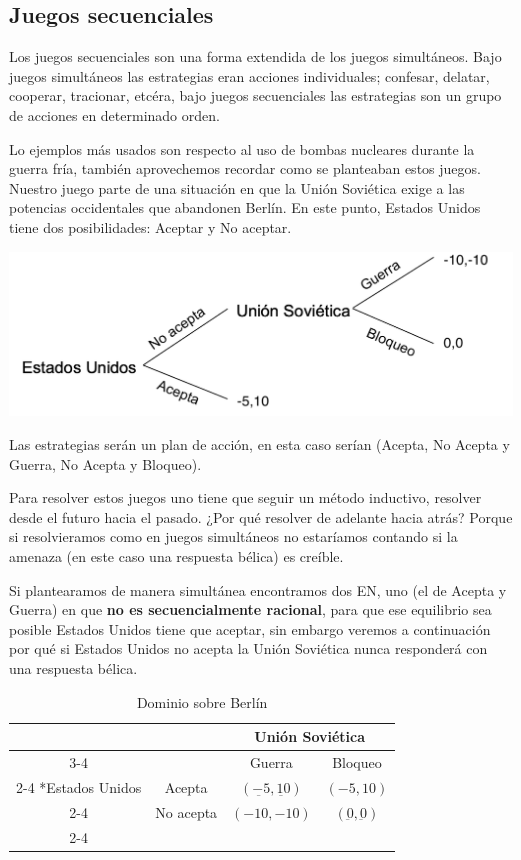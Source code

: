\subsection{Juegos secuenciales}

Los juegos secuenciales son una forma extendida de los juegos simultáneos. Bajo juegos simultáneos las estrategias eran acciones individuales; confesar, delatar, cooperar, tracionar, etcéra, bajo juegos secuenciales las estrategias son un grupo de acciones en determinado orden. 

Lo ejemplos más usados son respecto al uso de bombas nucleares durante la guerra fría, también aprovechemos recordar como se planteaban estos juegos. Nuestro juego parte de una situación en que la Unión Soviética exige a las potencias
occidentales que abandonen Berlín. En este punto, Estados Unidos tiene dos posibilidades:
Aceptar y No aceptar.

\begin{center}
    \includegraphics[scale=0.5]{Figuras/juegos secuencia.png}  
\end{center}
Las estrategias serán un plan de acción, en esta caso serían (Acepta, No Acepta y Guerra, No Acepta y Bloqueo).

Para resolver estos juegos uno tiene que seguir un método inductivo, resolver desde el futuro hacia el pasado. ¿Por qué resolver de adelante hacia atrás? Porque si resolvieramos como en juegos simultáneos no estaríamos contando si la amenaza (en este caso una respuesta bélica) es creíble. 

Si plantearamos de manera simultánea encontramos dos EN, uno (el de Acepta y Guerra) en que \textbf{no es secuencialmente racional}, para que ese equilibrio sea posible Estados Unidos tiene que aceptar, sin embargo veremos a continuación por qué si Estados Unidos no acepta la Unión Soviética nunca responderá con una respuesta bélica.

\begin{table}[!htbp]
    \centering
    \caption{Dominio sobre Berlín}
    \setlength{\extrarowheight}{2pt}
    \begin{tabular}{*{4}{c|}}
      \multicolumn{2}{c}{} & \multicolumn{2}{c}{Unión Soviética}\\\cline{3-4}
      \multicolumn{1}{c}{} &  & Guerra & Bloqueo \\\cline{2-4}
      \multirow{2}*{Estados Unidos}  & Acepta & $(\underbar{-5},\underbar{10})$ & $(-5,10)$ \\\cline{2-4}
      & No acepta & $(-10,-10)$ & $(\underbar{0},\underbar{0})$ \\\cline{2-4}
    \end{tabular}
  \end{table}

